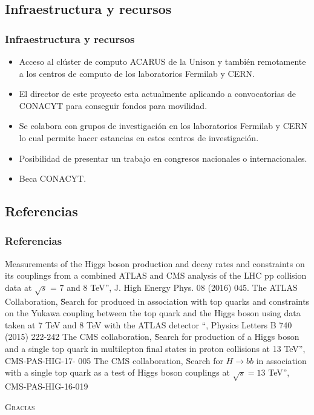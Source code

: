 \documentclass[11pt]{beamer}
\begin{document}
\begin{frame}
\section{Infraestructura y recursos }
\frametitle{Infraestructura y recursos}
\begin{itemize}
\item Acceso al clúster de computo \textsc{ACARUS} de la Unison y también remotamente a los centros
de computo de los laboratorios Fermilab y CERN.
\item El director de este proyecto esta actualmente aplicando a convocatorias de
CONACYT para conseguir fondos para movilidad.
\item Se colabora con grupos de investigación en los laboratorios Fermilab y CERN lo
cual permite hacer estancias en estos centros de investigación.
\item Posibilidad de presentar un trabajo en congresos nacionales o
internacionales.
\item Beca CONACYT.
\end{itemize}
\end{frame}


\begin{frame}
\section{Referencias}
\frametitle{Referencias}

\begin{thebibliography}{99}
\"Measurements of the Higgs boson production and decay rates and constraints on
its couplings from a combined ATLAS and CMS analysis of the LHC pp collision
data at $\sqrt{s}$ = 7 and 8 TeV”, J. High Energy Phys. 08 (2016) 045.
The ATLAS Collaboration, \"Search for produced in association with top quarks
and constraints on the Yukawa coupling between the top quark and the Higgs
boson using data taken at 7 TeV and 8 TeV with the ATLAS detector “, Physics
Letters B 740 (2015) 222-242
The CMS collaboration, \"Search for production of a Higgs boson and a single top
quark in multilepton final states in proton collisions at 13 TeV”, CMS-PAS-HIG-17-
005
The CMS collaboration, \"Search for $H \rightarrow bb$ in association with a single top quark
as a test of Higgs boson couplings at $\sqrt{s}= 13$ TeV”, CMS-PAS-HIG-16-019
\end{thebibliography}
\end{frame}


\begin{frame}
\textsc{Gracias}
\end{frame}
\end{document}

